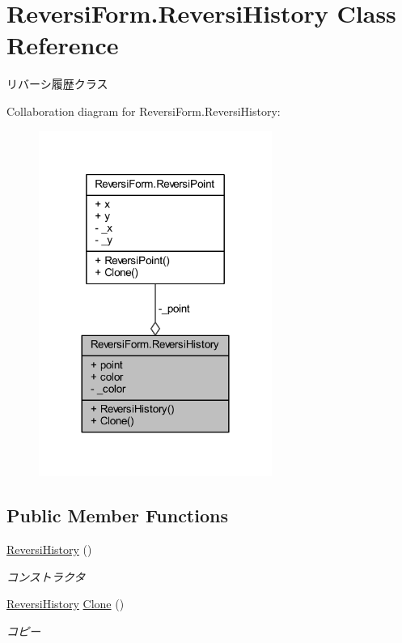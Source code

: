 \hypertarget{class_reversi_form_1_1_reversi_history}{}\section{Reversi\+Form.\+Reversi\+History Class Reference}
\label{class_reversi_form_1_1_reversi_history}


リバーシ履歴クラス  




Collaboration diagram for Reversi\+Form.\+Reversi\+History\+:
\nopagebreak
\begin{figure}[H]
\begin{center}
\leavevmode
\includegraphics[width=216pt]{class_reversi_form_1_1_reversi_history__coll__graph}
\end{center}
\end{figure}
\subsection*{Public Member Functions}
\begin{DoxyCompactItemize}
\item 
\hyperlink{class_reversi_form_1_1_reversi_history_aef9c390a68d81077b70bc6181587106b}{Reversi\+History} ()
\begin{DoxyCompactList}\small\item\em コンストラクタ \end{DoxyCompactList}\item 
\hyperlink{class_reversi_form_1_1_reversi_history}{Reversi\+History} \hyperlink{class_reversi_form_1_1_reversi_history_abfbbd1ca8654256ba743c3f07b573484}{Clone} ()
\begin{DoxyCompactList}\small\item\em コピー \end{DoxyCompactList}\end{DoxyCompactItemize}
